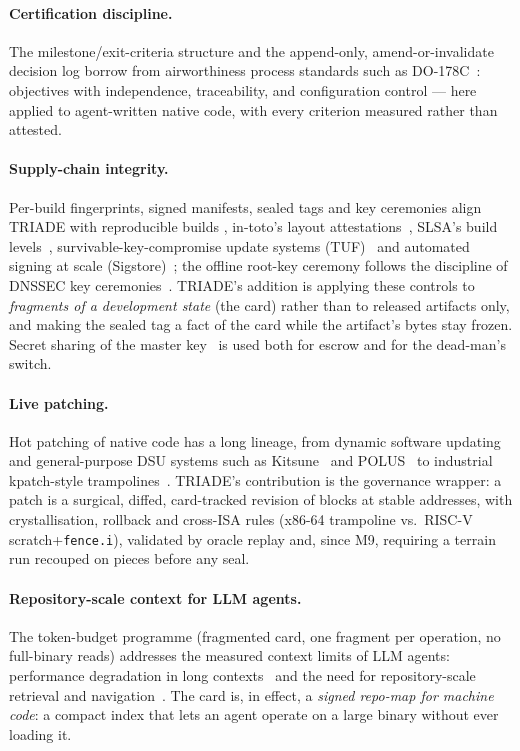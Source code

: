 \documentclass[11pt,a4paper]{article}
\newcommand{\code}[1]{\texttt{\small #1}}
\begin{document}
\paragraph{Certification discipline.} The milestone/exit-criteria
structure and the append-only, amend-or-invalidate decision log borrow
from airworthiness process standards such as
DO-178C~\cite{do178c}: objectives with independence, traceability, and
configuration control --- here applied to agent-written native code, with
every criterion measured rather than attested.

\paragraph{Supply-chain integrity.} Per-build fingerprints, signed
manifests, sealed tags and key ceremonies align TRIADE with
reproducible builds \cite{lamb2022}, in-toto's layout
attestations~\cite{intoto2019}, SLSA's build levels~\cite{slsa},
survivable-key-compromise update systems (TUF)~\cite{tuf2010} and
automated signing at scale (Sigstore)~\cite{sigstore2022}; the offline
root-key ceremony follows the discipline of DNSSEC key
ceremonies~\cite{rfc4033}. TRIADE's addition is applying these controls
to \emph{fragments of a development state} (the card) rather than to
released artifacts only, and making the sealed tag a fact of the card
while the artifact's bytes stay frozen. Secret sharing of the master
key~\cite{shamir1979} is used both for escrow and for the dead-man's
switch.

\paragraph{Live patching.} Hot patching of native code has a long
lineage, from dynamic software updating~\cite{hicks2002} and
general-purpose DSU systems such as Kitsune~\cite{hayden2012kitsune} and
POLUS~\cite{polusDSU} to industrial kpatch-style
trampolines~\cite{kpatch}. TRIADE's contribution is the
governance wrapper: a patch is a surgical, diffed, card-tracked revision
of blocks at stable addresses, with crystallisation, rollback and
cross-ISA rules (x86-64 trampoline vs.\ RISC-V scratch+\code{fence.i}),
validated by oracle replay and, since M9, requiring a terrain run
recouped on pieces before any seal.

\paragraph{Repository-scale context for LLM agents.} The token-budget
programme (fragmented card, one fragment per operation, no full-binary
reads) addresses the measured context limits of LLM agents: performance
degradation in long contexts~\cite{liu2024} and the need for
repository-scale retrieval and navigation~\cite{zhang2023, jimenez2024}.
The card is, in effect, a \emph{signed repo-map for machine code}: a
compact index that lets an agent operate on a large binary without ever
loading it.
\end{document}
